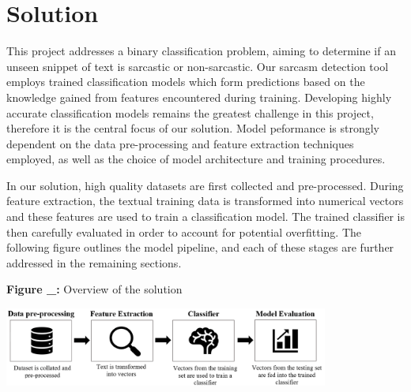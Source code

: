 \documentclass[12pt,a4paper]{article}
\begin{document}

\section{Solution}
\noindent This project addresses a binary classification problem, aiming to determine if an unseen snippet of text is sarcastic or non-sarcastic. Our sarcasm detection tool employs trained classification models which form  predictions based on the knowledge gained from features encountered during training. Developing highly accurate classification models remains the greatest challenge in this project, therefore it is the central focus of our solution. Model peformance is strongly dependent on the data pre-processing and feature extraction techniques employed, as well as the choice of model architecture and training procedures. 

In our solution, high quality datasets are first collected and pre-processed. During feature extraction, the textual training data is transformed into numerical vectors and these features are used to train a classification model. The trained classifier is then carefully evaluated in order to account for potential overfitting. The following figure outlines the model pipeline, and each of these stages are further addressed in the remaining sections.



\begin{center}
	\textbf{Figure \_:} Overview of the solution
\end{center}
\begin{center}
	\includegraphics[width=0.8\textwidth]{Images/modelpipeline2.png}
	\label{Model Pipeline}
\end{center}
\end{document}
